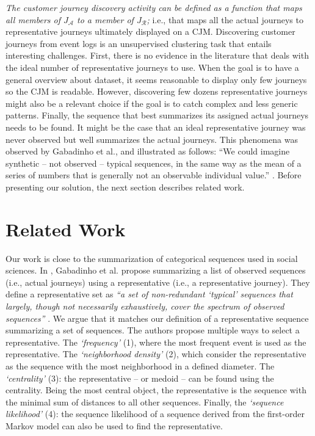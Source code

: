 \documentclass[runningheads]{llncs}
\begin{document}
{\it The customer journey discovery activity can be defined as a function that maps all members of $J_{\mathcal{A}}$ to a member of $J_{\mathcal{R}}$;} i.e., that maps all the actual journeys to representative journeys ultimately displayed on a CJM. Discovering customer journeys from event logs is an unsupervised clustering task that entails interesting challenges. First, there is no evidence in the literature that deals with the ideal number of representative journeys to use. When the goal is to have a general overview about dataset, it seems reasonable to display only few journeys so the CJM is readable. However, discovering few dozens representative journeys might also be a relevant choice if the goal is to catch complex and less generic patterns. Finally, the sequence that best summarizes its assigned actual journeys needs to be found. It might be the case that an ideal representative journey was never observed but well summarizes the actual journeys. This phenomena was observed by Gabadinho et al., and illustrated as follows: ``We could imagine synthetic -- not observed -- typical sequences, in the same way as the mean of a series of numbers that is generally not an observable individual value.'' \cite{gabadinho2009extracting}. Before presenting our solution, the next section describes related work.

\section{Related Work}
Our work is close to the summarization of categorical sequences used in social sciences. In \cite{gabadinho2009summarizing,gabadinho2009extracting}, Gabadinho et al. propose summarizing a list of observed sequences (i.e., actual journeys) using a representative (i.e., a representative journey). They define a representative set as {\it``a set of non-redundant `typical' sequences that largely, though not necessarily exhaustively, cover the spectrum of observed sequences''} \cite{gabadinho2009summarizing}. We argue that it matches our definition of a representative sequence summarizing a set of sequences. The authors propose multiple ways to select a representative. The {\it `frequency'} (1), where the most frequent event is used as the representative. The {\it `neighborhood density'} (2), which consider the representative as the sequence with the most neighborhood in a defined diameter. The {\it `centrality'} (3): the representative {-- or medoid --} can be found using the centrality. {Being the most central object,} the representative is the sequence with the minimal sum of distances to all other sequences. Finally, the {\it `sequence likelihood'} (4): the sequence likelihood of a sequence derived from the first-order Markov model can also be used to find the representative. 
\end{document}
